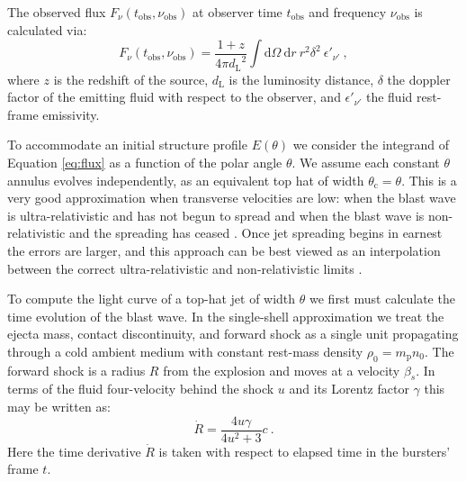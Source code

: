 \documentclass[twocolumn]{aastex62}
\newcommand{\dd}{\ensuremath{\mathrm{d}}}
\newcommand{\tobs}{\ensuremath{t_{\mathrm{obs}}}}
\newcommand{\nuobs}{\ensuremath{\nu_{\mathrm{obs}}}}
\newcommand{\thC}{\ensuremath{\theta_{\mathrm{c}}}}
\newcommand{\dL}{\ensuremath{d_{\mathrm{L}}}}
\newcommand{\Mp}{\ensuremath{m_{\mathrm{p}}}}
\begin{document}
The observed flux $F_\nu(\tobs, \nuobs)$ at observer time $\tobs$ and frequency $\nuobs$ is calculated via:
\begin{equation}
	F_\nu(\tobs, \nuobs) = \frac{1+z}{4\pi \dL^2} \int \! \dd \Omega\  \dd r\ r^2 \delta^2\ \epsilon'_{\nu'} \ , \label{eq:flux}
\end{equation}
where $z$ is the redshift of the source, $\dL$ is the luminosity distance, $\delta$ the doppler factor of the emitting fluid with respect to the observer, and $\epsilon'_{\nu'}$ the fluid rest-frame emissivity.

To accommodate an initial structure profile $E(\theta)$ we consider the integrand of Equation \eqref{eq:flux} as a function of the polar angle $\theta$.  We assume each constant $\theta$ annulus evolves independently, as an equivalent top hat of width $\thC = \theta$.  This is a very good approximation when transverse velocities are low: when the blast wave is ultra-relativistic and has not begun to spread and when the blast wave is non-relativistic and the spreading has ceased \citep{van-Eerten:2010aa}.  Once jet spreading begins in earnest the errors are larger, and this approach can be best viewed as an interpolation between the correct ultra-relativistic and non-relativistic limits \citep{van-Eerten:2010aa}.
 
To compute the light curve of a top-hat jet of width $\theta$ we first must calculate the time evolution of the blast wave. In the single-shell approximation we treat the ejecta mass, contact discontinuity, and forward shock as a single unit propagating through a cold ambient medium with constant rest-mass density $\rho_0 = \Mp n_0$.  The forward shock is a radius $R$ from the explosion and moves at a velocity $\beta_s$.  In terms of the fluid four-velocity behind the shock $u$ and its Lorentz factor $\gamma$ this may be written as:
\begin{equation}
	\dot{R} = \frac{4 u \gamma}{4 u^2 +3}c\ . \label{eq:Rdot}
\end{equation}
Here the time derivative $\dot{R}$ is taken with respect to elapsed time in the bursters' frame $t$.  
\end{document}
